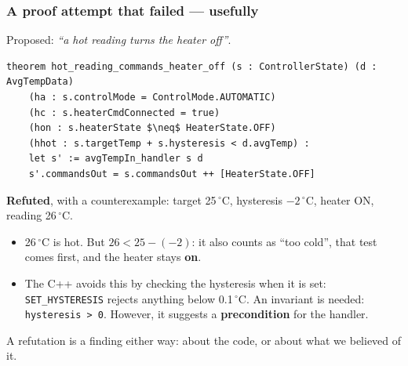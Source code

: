 \begin{frame}[fragile]
  \frametitle{A proof attempt that failed --- usefully} \small
{}

Proposed: {\em ``a hot reading turns the heater off''}.

\begin{lstlisting}[language=lean4]
theorem hot_reading_commands_heater_off (s : ControllerState) (d : AvgTempData)
    (ha : s.controlMode = ControlMode.AUTOMATIC)
    (hc : s.heaterCmdConnected = true)
    (hon : s.heaterState $\neq$ HeaterState.OFF)
    (hhot : s.targetTemp + s.hysteresis < d.avgTemp) :
    let s' := avgTempIn_handler s d
    s'.commandsOut = s.commandsOut ++ [HeaterState.OFF]
\end{lstlisting}

\vspace{-0.15cm}
\pause

{\bf Refuted}, with a counterexample: target 25\,$^\circ$C, hysteresis $-2\,^\circ$C,
heater ON, reading 26\,$^\circ$C.

\begin{itemize}\small
\item 26\,$^\circ$C is hot. But $26 < 25 - (-2)$: it
      also counts as ``too cold'', that test comes first, and the heater stays {\bf on}.

\pause      

\item The C++ avoids this by checking the hysteresis when it is set:
      {\tt SET\_HYSTERESIS} rejects anything below 0.1\,$^\circ$C.
      An invariant is needed: {\tt hysteresis > 0}.
      However, it suggests a {\bf precondition} for the handler.
\end{itemize}

\vspace{-0.1cm}
{\scriptsize A refutation is a finding either way: about the code, or about what we
believed of it.}

\end{frame}

